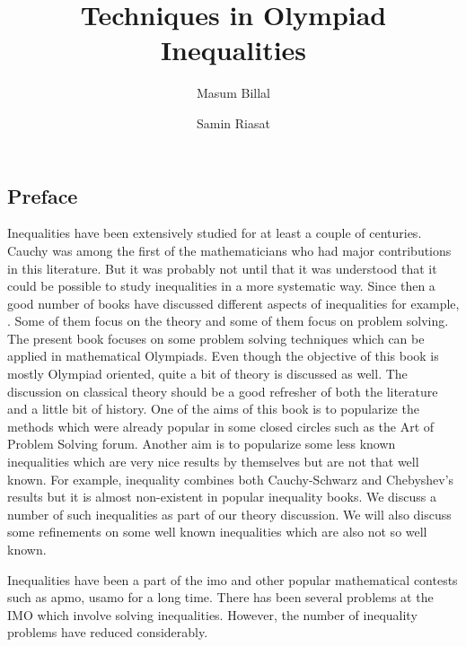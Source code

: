 \documentclass[a4paper, 12pt, leqno,]{book}
\title{\bfseries Techniques in Olympiad Inequalities}
\author{Masum Billal\and Samin Riasat}
\theoremstyle{definition}
\numberwithin{problem}{chapter}
\begin{document}
	\frontmatter
	\maketitle
	\begin{refsection}
		\section*{Preface}
		Inequalities have been extensively studied for at least a couple of centuries. Cauchy was among the first of the mathematicians who had major contributions in this literature. But it was probably not until \textcite{hardy_littlewood_poolya_2018} that it was understood that it could be possible to study inequalities in a more systematic way. Since then a good number of books have discussed different aspects of inequalities for example, \textcite{beckenbach_bellman_1983}. Some of them focus on the theory and some of them focus on problem solving. The present book focuses on some problem solving techniques which can be applied in mathematical Olympiads. Even though the objective of this book is mostly Olympiad oriented, quite a bit of theory is discussed as well. The discussion on classical theory should be a good refresher of both the literature and a little bit of history. One of the aims of this book is to popularize the methods which were already popular in some closed circles such as the Art of Problem Solving forum. Another aim is to popularize some less known inequalities which are very nice results by themselves but are not that well known. For example, \textcite{Seitz1936} inequality combines both Cauchy-Schwarz and Chebyshev's results but it is almost non-existent in popular inequality books. We discuss a number of such inequalities as part of our theory discussion. We will also discuss some refinements on some well known inequalities which are also not so well known.
		
		Inequalities have been a part of the \Gls{imo} and other popular mathematical contests such as \Gls{apmo}, \Gls{usamo} for a long time. There has been several problems at the IMO which involve solving inequalities. However, the number of inequality problems have reduced considerably. 
		\printbibliography
	\end{refsection}
	\tableofcontents
	\mainmatter
	\begin{refsection}
		
		
		
		
		
		
		\printbibliography
	\end{refsection}
	
\end{document}
